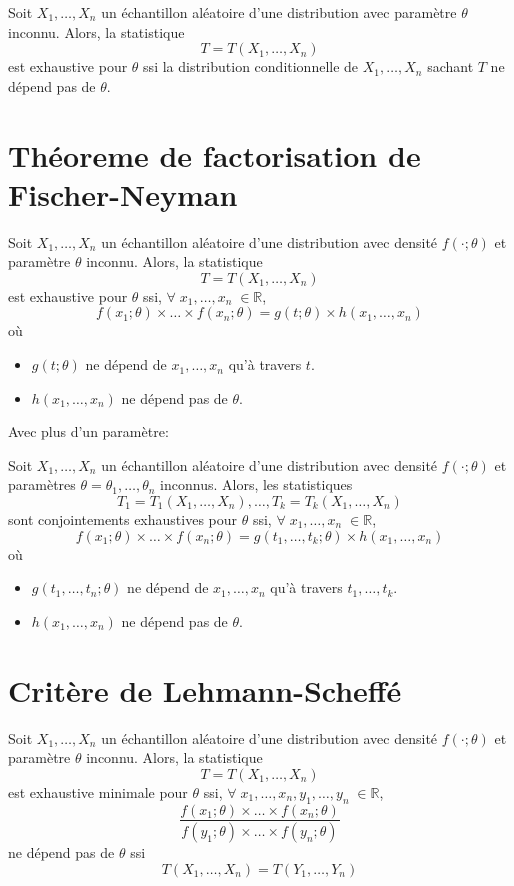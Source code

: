 Soit \(X_1,\dots,X_n\) un échantillon aléatoire d'une distribution avec
paramètre \(\theta\) inconnu. Alors, la statistique \[
T=T(X_1,\dots,X_n)
\] est exhaustive pour \(\theta\) ssi la distribution conditionnelle de
\(X_1,\dots,X_n\) sachant \(T\) ne dépend pas de \(\theta\).

\section{Théoreme de factorisation de Fischer-Neyman}\label{theoreme-de-factorisation-de-fischer-neyman}

Soit \(X_1,\dots,X_n\) un échantillon aléatoire d'une distribution avec
densité \(f(\cdot;\theta)\) et paramètre \(\theta\) inconnu. Alors, la
statistique \[
T=T(X_1,\dots,X_n)
\] est exhaustive pour \(\theta\) ssi,
\(\forall\;x_1,\dots,x_n\;\in\mathbb{R}\), \[
f(x_1;\theta)\times\dots\times f(x_n;\theta)=g(t;\theta)\times h(x_1,\dots,x_n)
\] où

\begin{itemize}
\item
  \(g(t;\theta)\) ne dépend de \(x_1,\dots,x_n\) qu'à travers \(t\).
\item
  \(h(x_1,\dots,x_n)\) ne dépend pas de \(\theta\).
\end{itemize}

Avec plus d'un paramètre:

Soit \(X_1,\dots,X_n\) un échantillon aléatoire d'une distribution avec
densité \(f(\cdot;\theta)\) et paramètres
\(\theta=\theta_1,\dots,\theta_n\) inconnus. Alors, les statistiques \[
T_1=T_1(X_1,\dots,X_n),\dots,T_k=T_k(X_1,\dots,X_n)
\] sont conjointements exhaustives pour \(\theta\) ssi,
\(\forall\;x_1,\dots,x_n\;\in\mathbb{R}\), \[
f(x_1;\theta)\times\dots\times f(x_n;\theta)=g(t_1,\dots,t_k;\theta)\times h(x_1,\dots,x_n)
\] où

\begin{itemize}
\item
  \(g(t_1,\dots,t_n;\theta)\) ne dépend de \(x_1,\dots,x_n\) qu'à
  travers \(t_1,\dots,t_k\).
\item
  \(h(x_1,\dots,x_n)\) ne dépend pas de \(\theta\).
\end{itemize}

\section{Critère de Lehmann-Scheffé}\label{critere-de-lehmann-scheffe}

Soit \(X_1,\dots,X_n\) un échantillon aléatoire d'une distribution avec
densité \(f(\cdot;\theta)\) et paramètre \(\theta\) inconnu. Alors, la
statistique \[
T=T(X_1,\dots,X_n)
\] est exhaustive minimale pour \(\theta\) ssi,
\(\forall\;x_1,\dots,x_n,y_1,\dots,y_n\;\in\mathbb{R}\), \[
\frac{f(x_1;\theta)\times\dots\times f(x_n;\theta)}{f(y_1;\theta)\times\dots\times f(y_n;\theta)}
\] ne dépend pas de \(\theta\) ssi \[
T(X_1,\dots,X_n)=T(Y_1,\dots,Y_n)
\]

